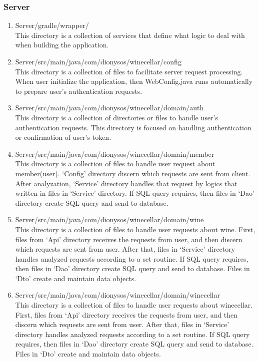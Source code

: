\documentclass[sigconf, nonacm]{acmart}
\begin{document}
    \subsubsection{\textbf{Server}}
    \begin{enumerate}
    \item Server/gradle/wrapper/ \\
    This directory is a collection of services that define what logic to deal with when building the application.
    \item Server/src/main/java/com/dionysos/winecellar/config \\
    This directory is a collection of files to facilitate server request processing. When user initialize the application, then WebConfig.java runs automatically to prepare user’s authentication requests.
    \item Server/src/main/java/com/dionysos/winecellar/domain/auth\\
    This directory is a collection of directories or files to handle user’s authentication requests. This directory is focused on handling authentication or confirmation of user’s token.
    \item Server/src/main/java/com/dionysos/winecellar/domain/member\\
    This directory is a collection of files to handle user request about member(user). ‘Config’ directory discern which requests are sent from client. After analyzation, ‘Service’ directory handles that request by logics that written in files in ‘Service’ directory. If SQL query requires, then files in ‘Dao’ directory create SQL query and send to database.
    \item Server/src/main/java/com/dionysos/winecellar/domain/wine\\
    This directory is a collection of files to handle user requests about wine. First, files from ‘Api’ directory receives the requests from user, and then discern which requests are sent from user. After that, files in ‘Service’ directory handles analyzed requests according to a set routine. If SQL query requires, then files in ‘Dao’ directory create SQL query and send to database. Files in ‘Dto’ create and maintain data objects.
    \item Server/src/main/java/com/dionysos/winecellar/domain/winecellar\\
    
This directory is a collection of files to handle user requests about winecellar. First, files from ‘Api’ directory receives the requests from user, and then discern which requests are sent from user. After that, files in ‘Service’ directory handles analyzed requests according to a set routine. If SQL query requires, then files in ‘Dao’ directory create SQL query and send to database. Files in ‘Dto’ create and maintain data objects.
\end{enumerate}
\end{document}
